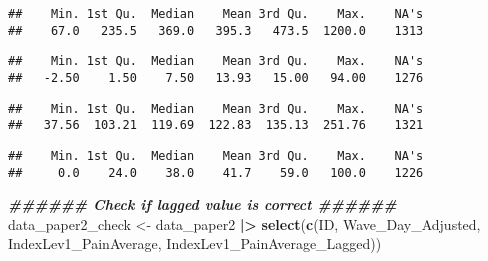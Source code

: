 \documentclass[
  12pt,
]{article}
\newenvironment{Shaded}{\begin{snugshade}}{\end{snugshade}}
\newcommand{\CommentTok}[1]{\textcolor[rgb]{0.56,0.35,0.01}{\textit{#1}}}
\newcommand{\DocumentationTok}[1]{\textcolor[rgb]{0.56,0.35,0.01}{\textbf{\textit{#1}}}}
\newcommand{\FunctionTok}[1]{\textcolor[rgb]{0.13,0.29,0.53}{\textbf{#1}}}
\newcommand{\NormalTok}[1]{#1}
\newcommand{\OtherTok}[1]{\textcolor[rgb]{0.56,0.35,0.01}{#1}}
\newcommand{\SpecialCharTok}[1]{\textcolor[rgb]{0.81,0.36,0.00}{\textbf{#1}}}
\begin{document}
\begin{verbatim}
##    Min. 1st Qu.  Median    Mean 3rd Qu.    Max.    NA's 
##    67.0   235.5   369.0   395.3   473.5  1200.0    1313
\end{verbatim}

\begin{Shaded}
\end{Shaded}

\begin{verbatim}
##    Min. 1st Qu.  Median    Mean 3rd Qu.    Max.    NA's 
##   -2.50    1.50    7.50   13.93   15.00   94.00    1276
\end{verbatim}

\begin{Shaded}
\end{Shaded}

\begin{verbatim}
##    Min. 1st Qu.  Median    Mean 3rd Qu.    Max.    NA's 
##   37.56  103.21  119.69  122.83  135.13  251.76    1321
\end{verbatim}

\begin{Shaded}
\end{Shaded}

\begin{verbatim}
##    Min. 1st Qu.  Median    Mean 3rd Qu.    Max.    NA's 
##     0.0    24.0    38.0    41.7    59.0   100.0    1226
\end{verbatim}

\begin{Shaded}
\begin{Highlighting}[]
\DocumentationTok{\#\#\#\#\#\# Check if lagged value is correct \#\#\#\#\#\#}
\NormalTok{data\_paper2\_check }\OtherTok{\textless{}{-}}\NormalTok{ data\_paper2 }\SpecialCharTok{|\textgreater{}}
  \FunctionTok{select}\NormalTok{(}\FunctionTok{c}\NormalTok{(ID, Wave\_Day\_Adjusted, IndexLev1\_PainAverage, IndexLev1\_PainAverage\_Lagged))}
\end{Highlighting}
\end{Shaded}
\end{document}
